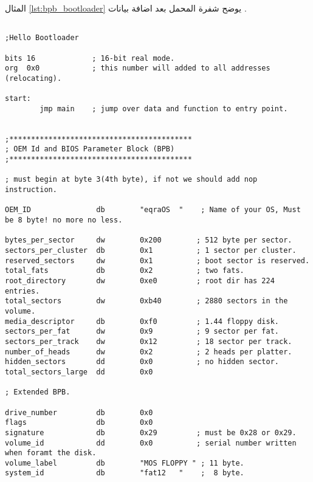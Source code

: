 \documentclass[document.tex]{subfiles}
\begin{document}

المثال \ref{lst:bpb_bootloader} يوضح شفرة المحمل بعد اضافة بيانات .


\begin{english}

\lstset{numberstyle=\tiny,numbersep=5pt,tabsize=2,extendedchars=true,breaklines=true,frame=b,showspaces=false, showtabs=false,xleftmargin=10pt,framexleftmargin=10pt,framexrightmargin=5pt,framexbottommargin=4pt,showstringspaces=false,language=[x86masm]Assembler}

\begin{lstlisting}[label=lst:bpb_bootloader,caption=BPB example]

;Hello Bootloader

bits 16				; 16-bit real mode.
org	 0x0			; this number will added to all addresses (relocating).

start:
		jmp main	; jump over data and function to entry point.
		
		
;******************************************
; OEM Id and BIOS Parameter Block (BPB) 
;******************************************

; must begin at byte 3(4th byte), if not we should add nop instruction.

OEM_ID               db        "eqraOS  "    ; Name of your OS, Must be 8 byte! no more no less.

bytes_per_sector     dw        0x200		; 512 byte per sector.
sectors_per_cluster  db        0x1          ; 1 sector per cluster.
reserved_sectors     dw        0x1          ; boot sector is reserved.
total_fats           db        0x2          ; two fats.
root_directory       dw        0xe0         ; root dir has 224 entries.
total_sectors        dw        0xb40        ; 2880 sectors in the volume.
media_descriptor     db        0xf0         ; 1.44 floppy disk.
sectors_per_fat      dw        0x9          ; 9 sector per fat.
sectors_per_track    dw        0x12         ; 18 sector per track.
number_of_heads      dw        0x2          ; 2 heads per platter.
hidden_sectors       dd        0x0          ; no hidden sector.
total_sectors_large  dd        0x0

; Extended BPB.

drive_number         db        0x0
flags                db        0x0
signature            db        0x29         ; must be 0x28 or 0x29.
volume_id            dd        0x0          ; serial number written when foramt the disk.
volume_label         db        "MOS FLOPPY " ; 11 byte.
system_id            db        "fat12   "    ;  8 byte.



\end{lstlisting}
\end{english}
\end{document}
